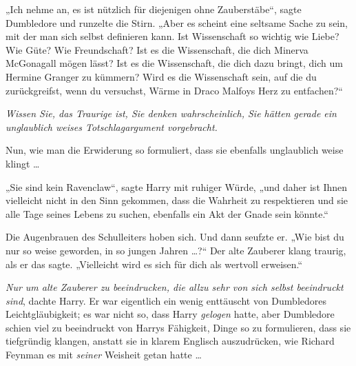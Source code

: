 „Ich nehme an, es ist nützlich für diejenigen ohne Zauberstäbe“, sagte Dumbledore und runzelte die Stirn.
„Aber es scheint eine seltsame Sache zu sein, mit der man sich selbst definieren kann. Ist Wissenschaft so wichtig wie Liebe? Wie Güte? Wie Freundschaft? Ist es die Wissenschaft, die dich Minerva McGonagall mögen lässt? Ist es die Wissenschaft, die dich dazu bringt, dich um Hermine Granger zu kümmern? Wird es die Wissenschaft sein, auf die du zurückgreifst, wenn du versuchst, Wärme in Draco Malfoys Herz zu entfachen?“

\emph{Wissen Sie, das Traurige ist, Sie denken wahrscheinlich, Sie hätten gerade ein unglaublich weises Totschlagargument vorgebracht.}

Nun, wie man die Erwiderung so formuliert, dass sie ebenfalls unglaublich weise klingt …

„Sie sind kein Ravenclaw“, sagte Harry mit ruhiger Würde, „und daher ist Ihnen vielleicht nicht in den Sinn gekommen, dass die Wahrheit zu respektieren und sie alle Tage seines Lebens zu suchen, ebenfalls ein Akt der Gnade sein könnte.“

Die Augenbrauen des Schulleiters hoben sich. Und dann seufzte er.
„Wie bist du nur so weise geworden, in so jungen Jahren …?“ Der alte Zauberer klang traurig, als er das sagte.
„Vielleicht wird es sich für dich als wertvoll erweisen.“

\emph{Nur um alte Zauberer zu beeindrucken, die allzu sehr von sich selbst beeindruckt sind}, dachte Harry. Er war eigentlich ein wenig enttäuscht von Dumbledores Leichtgläubigkeit; es war nicht so, dass Harry \emph{gelogen} hatte, aber Dumbledore schien viel zu beeindruckt von Harrys Fähigkeit, Dinge so zu formulieren, dass sie tiefgründig klangen, anstatt sie in klarem Englisch auszudrücken, wie Richard Feynman es mit \emph{seiner} Weisheit getan hatte …

